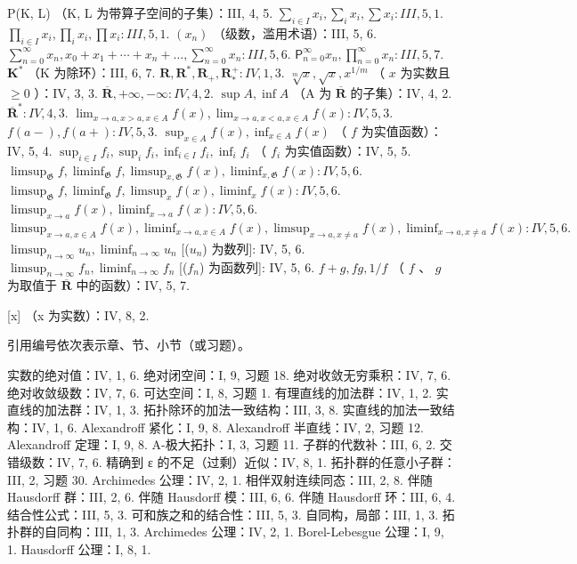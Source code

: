 P(K, L) （K, L 为带算子空间的子集）：III, 4, 5. \(\sum_{i \in I} x_i, \sum_{i} x_i, \sum x_i: III, 5, 1.\) \(\prod_{i \in I} x_i, \prod_{i} x_i, \prod x_i: III, 5, 1.\) \((x_n)\) （级数，滥用术语）：III, 5, 6. \(\sum_{n=0}^{\infty} x_n, x_0 + x_1 + \cdots + x_n + \ldots, \sum_{n=0}^{\infty} x_n: III, 5, 6.\) \(\mathsf{P}_{n=0}^{\infty} x_n, \prod_{n=0}^{\infty} x_n: III, 5, 7.\) \(\mathbf{K}^*\) （K 为除环）：III, 6, 7. \(\mathbf{R}, \mathbf{R}^*, \mathbf{R}_+, \mathbf{R}_*^+: IV, 1, 3.\) \(\sqrt[m]{x}, \sqrt{x}, x^{1/m}\) （ \(x\) 为实数且 \(\geqslant 0\) ）：IV, 3, 3. \(\overline{\mathbf{R}}, +\infty, -\infty: IV, 4, 2.\) \(\sup A, \inf A\) （A 为 \(\overline{\mathbf{R}}\) 的子集）：IV, 4, 2. \(\overline{\mathbf{R}}^*: IV, 4, 3.\) \(\lim_{x \to a, x > a, x \in A} f(x), \lim_{x \to a, x < a, x \in A} f(x): IV, 5, 3.\) \(f(a - ), f(a + ): IV, 5, 3.\) \(\sup_{x \in A} f(x), \inf_{x \in A} f(x)\) （ \(f\) 为实值函数）：IV, 5, 4. \(\sup_{i \in I} f_i, \sup_{i} f_i, \inf_{i \in I} f_i, \inf_{i} f_i\) （ \(f_i\) 为实值函数）：IV, 5, 5. \(\limsup_{\mathfrak{G}} f, \liminf_{\mathfrak{G}} f, \limsup_{x,\mathfrak{G}} f(x), \liminf_{x,\mathfrak{G}} f(x): IV, 5, 6.\) \(\limsup_{\mathfrak{G}} f, \liminf_{\mathfrak{G}} f, \limsup_{x} f(x), \liminf_{x} f(x): IV, 5, 6.\) \(\limsup_{x \to a} f(x), \liminf_{x \to a} f(x): IV, 5, 6.\) \(\limsup_{x \to a, x \in A} f(x), \liminf_{x \to a, x \in A} f(x), \limsup_{x \to a, x \neq a} f(x), \liminf_{x \to a, x \neq a} f(x): IV, 5, 6.\) \(\limsup_{n \to \infty} u_n, \liminf_{n \to \infty} u_n\) {[}(\(u_n\)) 为数列{]}: IV, 5, 6. \(\limsup_{n \to \infty} f_n, \liminf_{n \to \infty} f_n\) {[}(\(f_n\)) 为函数列{]}: IV, 5, 6. \(f + g, fg, 1/f\) （ \(f\) 、 \(g\) 为取值于 \(\overline{\mathbf{R}}\) 中的函数）：IV, 5, 7.

{[}x{]} （x 为实数）：IV, 8, 2.


引用编号依次表示章、节、小节（或习题）。

实数的绝对值：IV, 1, 6. 绝对闭空间：I, 9, 习题 18. 绝对收敛无穷乘积：IV, 7, 6. 绝对收敛级数：IV, 7, 6. 可达空间：I, 8, 习题 1. 有理直线的加法群：IV, 1, 2. 实直线的加法群：IV, 1, 3. 拓扑除环的加法一致结构：III, 3, 8. 实直线的加法一致结构：IV, 1, 6. Alexandroff 紧化：I, 9, 8. Alexandroff 半直线：IV, 2, 习题 12. Alexandroff 定理：I, 9, 8. A-极大拓扑：I, 3, 习题 11. 子群的代数补：III, 6, 2. 交错级数：IV, 7, 6. 精确到 ε 的不足（过剩）近似：IV, 8, 1. 拓扑群的任意小子群：III, 2, 习题 30. Archimedes 公理：IV, 2, 1. 相伴双射连续同态：III, 2, 8. 伴随 Hausdorff 群：III, 2, 6. 伴随 Hausdorff 模：III, 6, 6. 伴随 Hausdorff 环：III, 6, 4. 结合性公式：III, 5, 3. 可和族之和的结合性：III, 5, 3. 自同构，局部：III, 1, 3. 拓扑群的自同构：III, 1, 3. Archimedes 公理：IV, 2, 1. Borel-Lebesgue 公理：I, 9, 1. Hausdorff 公理：I, 8, 1.

